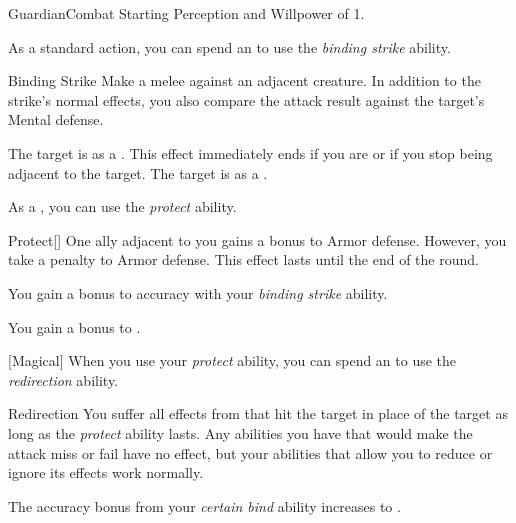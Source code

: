     \begin{feat}{Guardian}{Combat}
        \featpre Starting Perception and Willpower of 1.

         As a standard action, you can spend an  to use the \textit{binding strike} ability.
        \begin{ability}{Binding Strike}
            Make a melee  against an adjacent creature.
            In addition to the strike's normal effects, you also compare the attack result against the target's Mental defense.

            \hit The target is  as a .
            This effect immediately ends if you are  or if you stop being adjacent to the target.
            \crit The target is  as a .
        \end{ability}

         As a , you can use the \textit{protect} ability.
        \begin{ability}{Protect}[]
            One ally adjacent to you gains a  bonus to Armor defense.
            However, you take a  penalty to Armor defense.
            This effect lasts until the end of the round.
        \end{ability}

         You gain a  bonus to accuracy with your \textit{binding strike} ability.

         You gain a  bonus to .

        [Magical] When you use your \textit{protect} ability, you can spend an  to use the \textit{redirection} ability.
        \begin{ability}{Redirection}
            You suffer all effects from  that hit the target in place of the target as long as the \textit{protect} ability lasts.
            Any abilities you have that would make the attack miss or fail have no effect, but your abilities that allow you to reduce or ignore its effects work normally.
        \end{ability}

         The accuracy bonus from your \textit{certain bind} ability increases to .


\end{feat}
